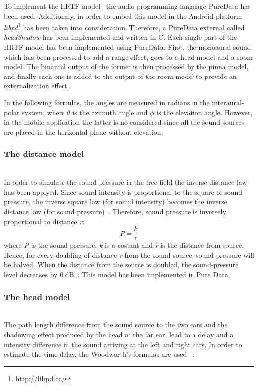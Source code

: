 \documentclass[journal]{IEEEtran}
\begin{document}
To implement the HRTF model~\cite{Brown1997} the audio programming language PureData has been used. Additionaly, in order to embed this model in the Android platform \textit{libpd}\footnote{http://libpd.cc/} has been taken into consideration. Therefore, a PureData external called \textit{headShadow} has been implemented and written in C. Each single part of the HRTF model has been implemented using PureData. 
First, the monoaural sound which has been processed to add a range effect, goes to a head model and a room model. The binaural output of the former is then processed by the pinna model, and finally each one is added to the output of the room model to provide an externalization effect.

In the following formulas, the angles are measured in radians in the interaural-polar system, where $\theta$ is the azimuth angle and $\phi$ is the elevation angle. However, in the mobile application the latter is no considered since all the sound sources are placed in the horizontal plane without elevation.

\subsubsection{The distance model}~\\
In order to simulate the sound pressure in the free field the inverse distance law has been applyed. Since sound intensity is proportional to the square of sound pressure, the inverse square law (for sound intensity) becomes the inverse distance law (for sound pressure)~\cite{everest2009master}. Therefore, sound pressure is inversely proportional to distance \textit{r}:
\begin{equation}\label{eq:soundpressure}
P = \frac{k}{r}
\end{equation}
where \textit{P} is the sound pressure, \textit{k} is a costant and \textit{r} is the distance from source.
Hence, for every doubling of distance \textit{r} from the sound source, sound pressure will be halved. When the distance from
the source is doubled, the sound-pressure level decreases by 6 dB~\cite{everest2009master}.
This model has been implemented in Pure Data.

\subsubsection{The head model}~\\
The path length difference from the sound source to the two ears and the shadowing effect produced by the head at the far ear, lead to a delay and a intensity difference in the sound arriving at the left and right ears. In order to estimate the time delay, the Woodworth's formulas are used~\cite{Woodworth} :
\end{document}
